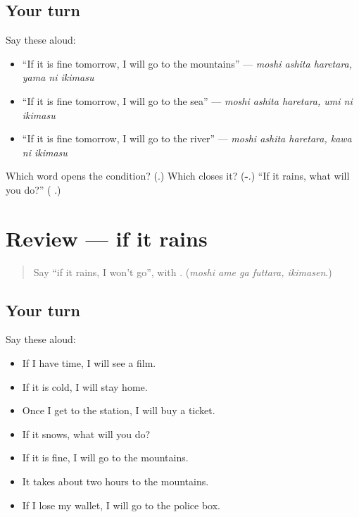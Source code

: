\subsection*{Your turn}
Say these aloud:

\begin{itemize}
\raggedright
  \item \textquotedblleft{}If it is fine tomorrow, I will go to the mountains\textquotedblright{} — \emph{moshi ashita haretara, yama ni ikimasu}
  \item \textquotedblleft{}If it is fine tomorrow, I will go to the sea\textquotedblright{} — \emph{moshi ashita haretara, umi ni ikimasu}
  \item \textquotedblleft{}If it is fine tomorrow, I will go to the river\textquotedblright{} — \emph{moshi ashita haretara, kawa ni ikimasu}
\end{itemize}

\begin{tcolorbox}[breakable,colback=teal!4,colframe=teal!35!black,title={Before you move on}]
Which word opens the condition? (\textbf{}.) Which closes it? (\textbf{-}.) \textquotedblleft{}If it rains, what will you do?\textquotedblright{} (\textbf{   }.)
\end{tcolorbox}
\section[(review)]{Review — if it rains}

\label{lesson:JA-R260-if-it-rains}



\begin{quote}
Say \textquotedblleft{}if it rains, I won't go\textquotedblright{}, with \textbf{}. (\emph{moshi ame ga futtara, ikimasen}.)
\end{quote}

\subsection*{Your turn}
Say these aloud:

\begin{itemize}
\raggedright
  \item If I have time, I will see a film.
  \item If it is cold, I will stay home.
  \item Once I get to the station, I will buy a ticket.
  \item If it snows, what will you do?
  \item If it is fine, I will go to the mountains.
  \item It takes about two hours to the mountains.
  \item If I lose my wallet, I will go to the police box.
\end{itemize}

